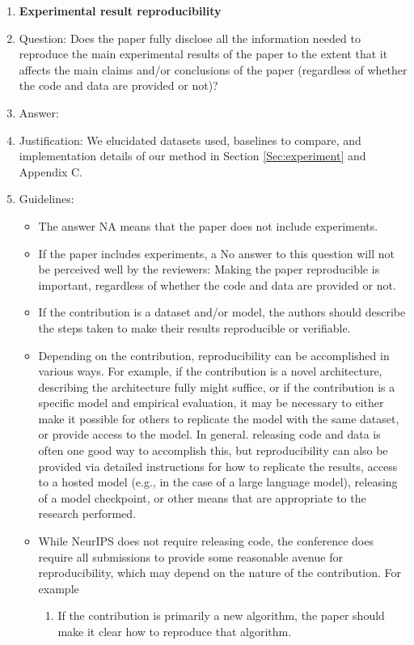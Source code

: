 \documentclass{article}
\begin{document}
\begin{enumerate}
    \item {\bf Experimental result reproducibility}
    \item[] Question: Does the paper fully disclose all the information needed to reproduce the main experimental results of the paper to the extent that it affects the main claims and/or conclusions of the paper (regardless of whether the code and data are provided or not)?
    \item[] Answer: \answerYes{} %
    \item[] Justification: We elucidated datasets used, baselines to compare, and implementation details of our method in Section \ref{Sec:experiment} and Appendix C.
    \item[] Guidelines:
    \begin{itemize}
        \item The answer NA means that the paper does not include experiments.
        \item If the paper includes experiments, a No answer to this question will not be perceived well by the reviewers: Making the paper reproducible is important, regardless of whether the code and data are provided or not.
        \item If the contribution is a dataset and/or model, the authors should describe the steps taken to make their results reproducible or verifiable. 
        \item Depending on the contribution, reproducibility can be accomplished in various ways. For example, if the contribution is a novel architecture, describing the architecture fully might suffice, or if the contribution is a specific model and empirical evaluation, it may be necessary to either make it possible for others to replicate the model with the same dataset, or provide access to the model. In general. releasing code and data is often one good way to accomplish this, but reproducibility can also be provided via detailed instructions for how to replicate the results, access to a hosted model (e.g., in the case of a large language model), releasing of a model checkpoint, or other means that are appropriate to the research performed.
        \item While NeurIPS does not require releasing code, the conference does require all submissions to provide some reasonable avenue for reproducibility, which may depend on the nature of the contribution. For example
        \begin{enumerate}
            \item If the contribution is primarily a new algorithm, the paper should make it clear how to reproduce that algorithm.

\end{enumerate}
\end{itemize}
\end{enumerate}
\end{document}
